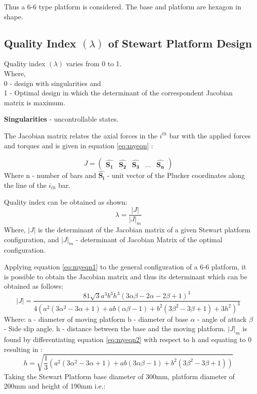 Thus a 6-6 type platform is considered. The base and platform are hexagon in shape.

\subsection{Quality Index $(\lambda)$ of Stewart Platform Design}
Quality index $(\lambda)$ varies from 0 to 1.\\
Where,\\
0 - design with singularities and\\
1 - Optimal design in which the determinant of the correspondent Jacobian matrix is maximum.

\textbf{Singularities} - uncontrollable states.

The Jacobian matrix relates the axial forces in the $i^{th}$ bar with the applied
forces and torques and is given in equation \eqref{eq:myeqn} \cite{fernandes_design_nodate}:

\begin{equation}
J =
\begin{pmatrix}
\hat{\boldsymbol{S_{1}}} & \hat{\boldsymbol{S_{2}}} & \hat{\boldsymbol{S_{3}}} & ... & \hat{\boldsymbol{S_{n}}}
\end{pmatrix}
\label{eq:myeqn1}
\end{equation}
Where n - number of bars and $ \hat{\boldsymbol{S_{i}}}$ - unit vector of the Plucker coordinates along the line of the
$i_{th}$ bar.

Quality index can be obtained as shown:
\begin{equation}
\lambda = \frac{|J|}{|J|_{m}}
\label{eq:myeqn}
\end{equation}
Where, $|J|$ is the determinant of the Jacobian matrix of a given Stewart platform configuration, and $ |J|_{m} $ - determinant of Jacobian Matrix of the optimal configuration.

Applying equation \ref{eq:myeqn1} to the general configuration of a 6-6 platform, it is
possible to obtain the Jacobian matrix and thus its determinant which can be obtained as follows:
\begin{equation}
|J| =
\frac{81 \sqrt{3} a^3 b^3 h^3 (3 \alpha \beta - 2 \alpha - 2 \beta +1)^3}{4(a^2(3 \alpha^2 - 3 \alpha + 1)+ ab(\alpha \beta - 1 )+ b^2(3 \beta^2 - 3 \beta + 1)+ 3h^2)^3}
\label{eq:myeqn2}
\end{equation}
Where: a - diameter of moving platform
b - diameter of base
$\alpha$ - angle of attack
$ \beta $ - Side slip angle.
h - distance between the base and the moving platform.
$|J|_{m}$ is found by differentiating equation \ref{eq:myeqn2} with respect to h and equating to 0 resulting in \cite{fernandes_design_nodate}:
\begin{equation}
h = \sqrt{\frac{1}{3}(a^2 (3 \alpha^2 - 3 \alpha + 1)+ ab (3\alpha\beta - 1)+b^2(3 \beta^2 - 3 \beta + 1))}
\label{eq:myeqn}
\end{equation}
Taking the Stewart Platform base diameter of 300mm, platform diameter of 200mm and height of 190mm i.e.: 

